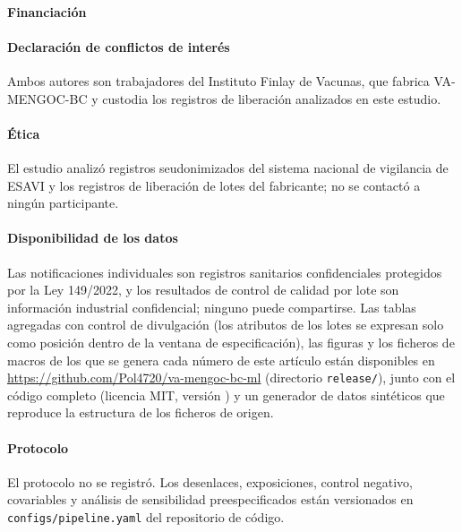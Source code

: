 \small
\paragraph{Financiación} 

\paragraph{Declaración de conflictos de interés} Ambos autores son trabajadores del Instituto Finlay
de Vacunas, que fabrica VA-MENGOC-BC y custodia los registros de liberación analizados en este
estudio. 

\paragraph{Ética} El estudio analizó registros seudonimizados del sistema nacional de vigilancia de
ESAVI y los registros de liberación de lotes del fabricante; no se contactó a ningún participante.

\paragraph{Disponibilidad de los datos} Las notificaciones individuales son registros sanitarios
confidenciales protegidos por la Ley 149/2022, y los resultados de control de calidad por lote son
información industrial confidencial; ninguno puede compartirse. Las tablas agregadas con control de
divulgación (los atributos de los lotes se expresan solo como posición dentro de la ventana de
especificación), las figuras y los ficheros de macros de los que se genera cada número de este
artículo están disponibles en \url{https://github.com/Pol4720/va-mengoc-bc-ml} (directorio
\texttt{release/}), junto con el código completo (licencia MIT, versión \VCodeVersion) y un
generador de datos sintéticos que reproduce la estructura de los ficheros de origen.

\paragraph{Protocolo} El protocolo no se registró. Los desenlaces, exposiciones, control negativo,
covariables y análisis de sensibilidad preespecificados están versionados en
\texttt{configs/pipeline.yaml} del repositorio de código.

